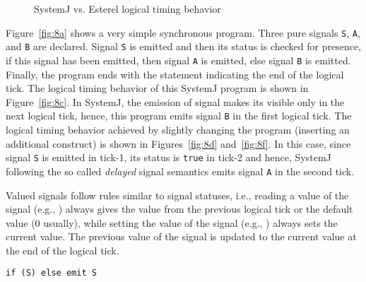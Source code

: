 \documentclass[10pt,journal,cspaper,compsoc]{IEEEtran}
\begin{document}
\begin{figure}[t!]
  \centering
\hspace{30pt}

\hspace{30pt}
  \caption{SystemJ vs. Esterel logical timing behavior}
  \label{fig:8}
\end{figure}

Figure~\ref{fig:8a} shows a very simple synchronous program. Three pure
signals \texttt{S}, \texttt{A}, and \texttt{B} are declared. Signal
\texttt{S} is emitted and then its status is checked for presence, if
this signal has been emitted, then signal \texttt{A} is emitted, else
signal \texttt{B} is emitted. Finally, the program ends with the
 statement indicating the end of the logical tick. The
logical timing behavior of this SystemJ program is shown in
Figure~\ref{fig:8c}. In SystemJ, the emission of signal makes its
visible only in the next logical tick, hence, this program emits signal
\texttt{B} in the first logical tick. The logical timing behavior
achieved by slightly changing the program (inserting an additional
 construct) is shown in Figures~\ref{fig:8d}
and~\ref{fig:8f}. In this case, since signal \texttt{S} is emitted in
tick-1, its status is \texttt{true} in tick-2 and hence, SystemJ
following the so called \textit{delayed} signal semantics emits signal
\texttt{A} in the second tick.

Valued signals follow rules similar to signal statuses, i.e., reading a
value of the signal (e.g., ) always gives the value from the
previous logical tick or the default value (0 usually), while setting
the value of the signal (e.g., ) always sets the current
value. The previous value of the signal is updated to the current value
at the end of the logical tick.

\newbox{\causalf}
\begin{lrbox}{\causalf}
  \begin{lstlisting}[style=sysj,morekeywords={signal,loop,abort,await,emit,present,trap,pause,exit,delay,suspend}]
    if (S) else emit S
  \end{lstlisting}
\end{lrbox}
\end{document}
